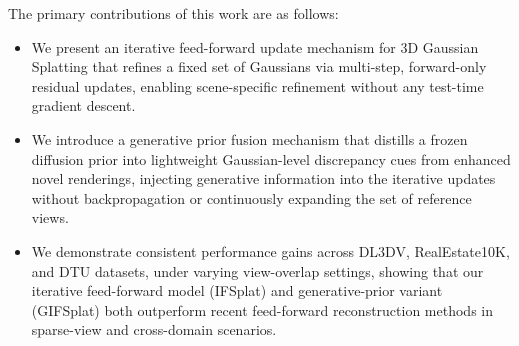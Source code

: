 
The primary contributions of this work are as follows:
\begin{itemize}
\item We present an iterative feed-forward update mechanism for 3D Gaussian Splatting that refines a fixed set of Gaussians via multi-step, forward-only residual updates, enabling scene-specific refinement without any test-time gradient descent.

\item We introduce a generative prior fusion mechanism that distills a frozen diffusion prior into lightweight Gaussian-level discrepancy cues from enhanced novel renderings, injecting generative information into the iterative updates without backpropagation or continuously expanding the set of reference views.

\item We demonstrate consistent performance gains across DL3DV, RealEstate10K, and DTU datasets, under varying view-overlap settings, showing that our iterative feed-forward model (IFSplat) and generative-prior variant (GIFSplat) both outperform recent feed-forward reconstruction methods in sparse-view and cross-domain scenarios.
\end{itemize}






